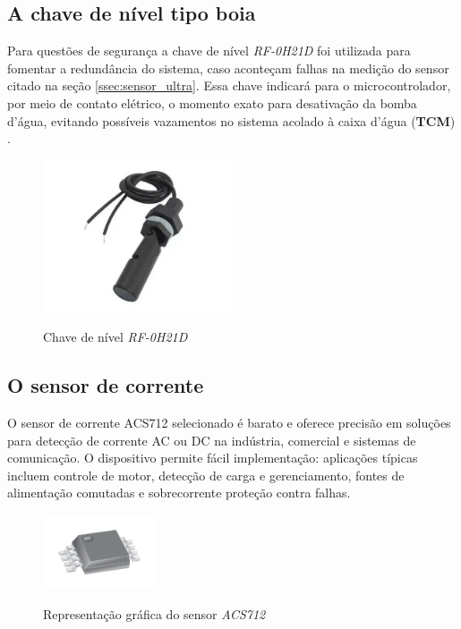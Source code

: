 \subsection{A chave de nível tipo boia}

Para questões de segurança a chave de nível \textit{RF-0H21D} foi utilizada para fomentar a redundância do sistema, caso aconteçam falhas na medição do sensor citado na seção \ref{ssec:sensor_ultra}. Essa chave indicará para o microcontrolador, por meio de contato elétrico, o momento exato para desativação da bomba d'água, evitando possíveis vazamentos no sistema acolado à caixa d'água (\textbf{TCM}) . 

\begin{figure}[H]
	\centering
	\caption{Chave de nível \textit{RF-0H21D}}
	\includegraphics[width=0.5\textwidth]{figuras/chave_boia.png}
	\label{fig:chaveboia}
\end{figure}


\subsection{O sensor de corrente}

O sensor de corrente ACS712 selecionado é barato e oferece precisão em
soluções para detecção de corrente AC ou DC na indústria,
comercial e sistemas de comunicação. O dispositivo permite fácil implementação: aplicações típicas incluem controle de motor, detecção de carga e
gerenciamento, fontes de alimentação comutadas e sobrecorrente
proteção contra falhas.


\begin{figure}[H]
	\centering
	\caption{Representação gráfica do sensor \textit{ACS712}}
	\includegraphics[width=0.3\textwidth]{figuras/ACS712.png}
	\label{fig:acs712}
\end{figure} 


